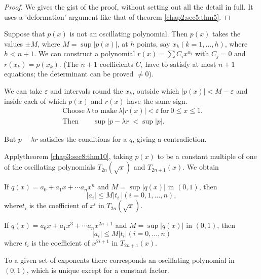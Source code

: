 \begin{proof}
  We gives the gist of the proof, without setting out all the detail
  in full. It uses a 'deformation' argument like that of theorem
  \ref{chap2:sec5:thm5}.   
\end{proof}

Suppose that $p(x)$ is not an oscillating polynomial. Then $p(x)$
takes the values $\pm M$, where $M=\sup |p(x)|$, at $h$ points, say
$x_k(k=1,\ldots, h)$, where $h< n+1$. We can construct a polynomial
$r(x)= \sum C_i x^{\alpha_i}$ with $C_j=0$ and $r(x_k)=p(x_k)$. (The
$n+1$ coefficients $C_i$ have to satisfy at most $n+1$ equations; the
determinant can be proved $\neq 0$). 

We can take $\varepsilon$ and intervals round the $x_k$, outside which
$|p(x)|<M-\varepsilon$ and inside each of which $p(x)$ and $r(x)$ have
the same sign. 
\begin{gather*}
  ~\text{Choose}~ \lambda ~\text{to make}~ \lambda |r(x)|<
  \varepsilon ~\text{for}~ 0 \leq x \leq 1.\\ 
  ~\text{Then} \qquad \sup |p-\lambda r|< \sup |p|.
\end{gather*}

But $p-\lambda r$ satisfies the conditions for a $q$, giving a contradiction.

Apply\pageoriginale theorem \ref{chap3:sec8:thm10}, taking $p(x)$ to be a constant multiple of one of
the oscillating polynomials $T_{2n}(\sqrt{x})$ and $T_{2n+1}(x)$. We
obtain  

\begin{corollary}\label{chap3:sec8:coro1} %
  If $q(x)=a_ 0 +a_1x + \cdots a_n x^n$ and $M=\sup |q(x)|$ in $(0,1)$, then
  $$
  |a_i|\leq M|t_i ~|(i=0,1, \ldots, n),
  $$
  where\pageoriginale $t_i$ is the coefficient of $x^i$ in $T_{2n}(\surd x)$.
\end{corollary}

\begin{corollary}\label{chap3:sec8:coro2} %
  If $q(x)=a_ 0 x +a_1 x^3+ \cdots a_n x^{2n+1}$ and $M= \sup |q(x)|$
  in $(0,1)$, then 
  $$
  |a_i|\leq M|t_i|(i=0, \ldots,n)
  $$
  where $t_i$ is the coefficient of $x^{2i+1}$ in $T_{2n+1}(x)$.
\end{corollary}

\begin{theorem}\label{chap3:sec8:thm11} %
  To a given set of exponents there corresponds an oscillating
  polynomial in $(0,1)$, which is unique except for a constant factor.
\end{theorem}

